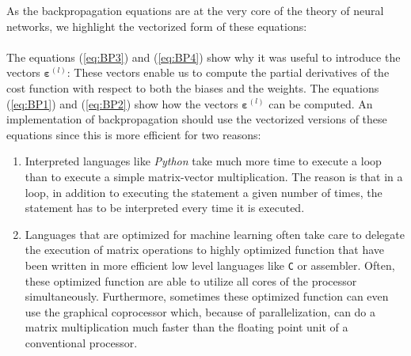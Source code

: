 As the backpropagation equations are at the very core of the theory of neural networks, we highlight the
vectorized form of these equations:
\\[0.2cm]
\hspace*{0.3cm}
\colorbox{red}{}
\\[0.2cm]
The equations (\ref{eq:BP3}) and (\ref{eq:BP4}) show why it was useful to introduce the
vectors $\boldsymbol{\varepsilon}^{(l)}$: These vectors enable us to compute the partial derivatives of the cost function
with respect to both the biases and the weights.  The equations (\ref{eq:BP1}) and (\ref{eq:BP2})
show how the vectors $\boldsymbol{\varepsilon}^{(l)}$ can be computed.  An implementation of backpropagation should use the vectorized
versions of these equations since this is more efficient for two reasons:
\begin{enumerate}
\item Interpreted languages like \textsl{Python} take much more time to
      execute a loop than to execute a simple matrix-vector multiplication.  The reason is that in a loop, in
      addition to executing the statement a given number of times, the statement has to be interpreted 
      every time it is executed.
\item Languages that are optimized for machine learning often take care to delegate the execution of matrix
      operations to highly optimized function that have been written in more efficient low level languages like
      \texttt{C} or assembler.  Often, these optimized function are able to utilize all cores of the processor
      simultaneously.  Furthermore, sometimes these optimized function can even use the graphical coprocessor
      which, because of parallelization,  can do a matrix multiplication much faster than the floating point unit of
      a conventional processor.
\end{enumerate}

